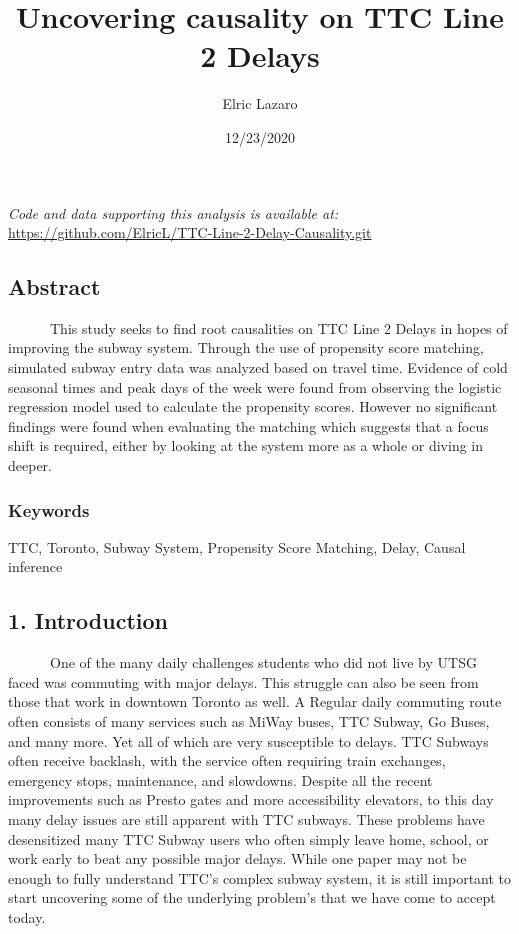 \documentclass[
]{article}
\title{Uncovering causality on TTC Line 2 Delays}
\author{Elric Lazaro}
\date{12/23/2020}
\begin{document}
\maketitle

\emph{Code and data supporting this analysis is available at:}\\
\url{https://github.com/ElricL/TTC-Line-2-Delay-Causality.git}

\hypertarget{abstract}{%
\subsection{Abstract}\label{abstract}}

~~~~~~This study seeks to find root causalities on TTC Line 2 Delays in
hopes of improving the subway system. Through the use of propensity
score matching, simulated subway entry data was analyzed based on travel
time. Evidence of cold seasonal times and peak days of the week were
found from observing the logistic regression model used to calculate the
propensity scores. However no significant findings were found when
evaluating the matching which suggests that a focus shift is required,
either by looking at the system more as a whole or diving in deeper.

\hypertarget{keywords}{%
\subsubsection{Keywords}\label{keywords}}

TTC, Toronto, Subway System, Propensity Score Matching, Delay, Causal
inference

\hypertarget{introduction}{%
\subsection{1. Introduction}\label{introduction}}

~~~~~~One of the many daily challenges students who did not live by UTSG
faced was commuting with major delays. This struggle can also be seen
from those that work in downtown Toronto as well. A Regular daily
commuting route often consists of many services such as MiWay buses, TTC
Subway, Go Buses, and many more. Yet all of which are very susceptible
to delays. TTC Subways often receive backlash, with the service often
requiring train exchanges, emergency stops, maintenance, and slowdowns.
Despite all the recent improvements such as Presto gates and more
accessibility elevators, to this day many delay issues are still
apparent with TTC subways. These problems have desensitized many TTC
Subway users who often simply leave home, school, or work early to beat
any possible major delays. While one paper may not be enough to fully
understand TTC's complex subway system, it is still important to start
uncovering some of the underlying problem's that we have come to accept
today.
\end{document}
